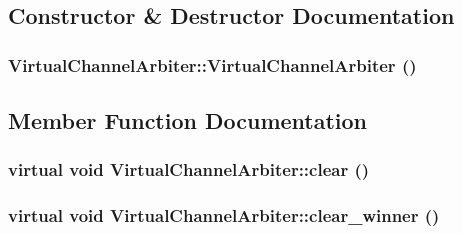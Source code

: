 \subsection{Constructor \& Destructor Documentation}
\hypertarget{classVirtualChannelArbiter_ceadea036b8d216d8b5a52b40d11daf3}{
\subsubsection[{VirtualChannelArbiter}]{\setlength{\rightskip}{0pt plus 5cm}VirtualChannelArbiter::VirtualChannelArbiter ()}}
\label{classVirtualChannelArbiter_ceadea036b8d216d8b5a52b40d11daf3}




\subsection{Member Function Documentation}
\hypertarget{classVirtualChannelArbiter_b1de3a733e3a17d6da028e72fe921f0c}{
\subsubsection[{clear}]{\setlength{\rightskip}{0pt plus 5cm}virtual void VirtualChannelArbiter::clear ()}}
\label{classVirtualChannelArbiter_b1de3a733e3a17d6da028e72fe921f0c}


\hypertarget{classVirtualChannelArbiter_5033871e1f5355b8bf0d3f319a449954}{
\subsubsection[{clear\_\-winner}]{\setlength{\rightskip}{0pt plus 5cm}virtual void VirtualChannelArbiter::clear\_\-winner ()}}
\label{classVirtualChannelArbiter_5033871e1f5355b8bf0d3f319a449954}


